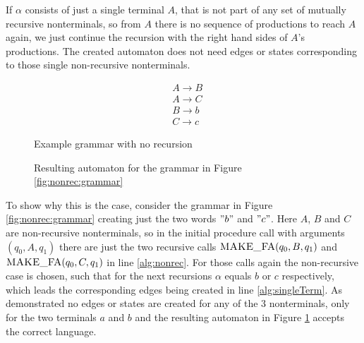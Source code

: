 If $\alpha$ consists of just a single terminal $A$, that is not part of any set of mutually recursive nonterminals, so from $A$ there is no sequence of productions to reach $A$ again, we just continue the recursion with the right hand sides of $A$'s productions. The created automaton does not need edges or states corresponding to those single non-recursive nonterminals. 


\begin{figure}[!h]
	\begin{minipage}[b]{.45\linewidth}
		\begin{align*}
			&A \rightarrow B\\
			&A \rightarrow C\\
			&B \rightarrow b\\
			&C \rightarrow c
		\end{align*}
		\caption{Example grammar with no recursion}
		\label{fig:nonrec:grammar}
	\end{minipage}
	\hfill
	\begin{minipage}[b]{.45\linewidth}
		\caption{Resulting automaton for the grammar in Figure \ref{fig:nonrec:grammar}}
		\label{fig:nonrec:automaton}
	\end{minipage}
\end{figure}


To show why this is the case, consider the grammar in Figure \ref{fig:nonrec:grammar} creating just the two words $"b"$ and $"c"$. Here $A$, $B$ and $C$ are non-recursive nonterminals, so in the initial procedure call with arguments $(q_0, A, q_1)$ there are just the two recursive calls $\textproc{MAKE\_FA}(q_0, B, q_1)$ and $\textproc{MAKE\_FA}(q_0, C, q_1)$ in line \ref{alg:nonrec}. For those calls again the non-recursive case is chosen, such that for the next recursions $\alpha$ equals $b$ or $c$ respectively, which leads the corresponding edges being created in line \ref{alg:singleTerm}. As demonstrated no edges or states are created for any of the 3 nonterminals, only for the two terminals $a$ and $b$ and the resulting automaton in Figure \ref{fig:nonrec:automaton} accepts the correct language.


